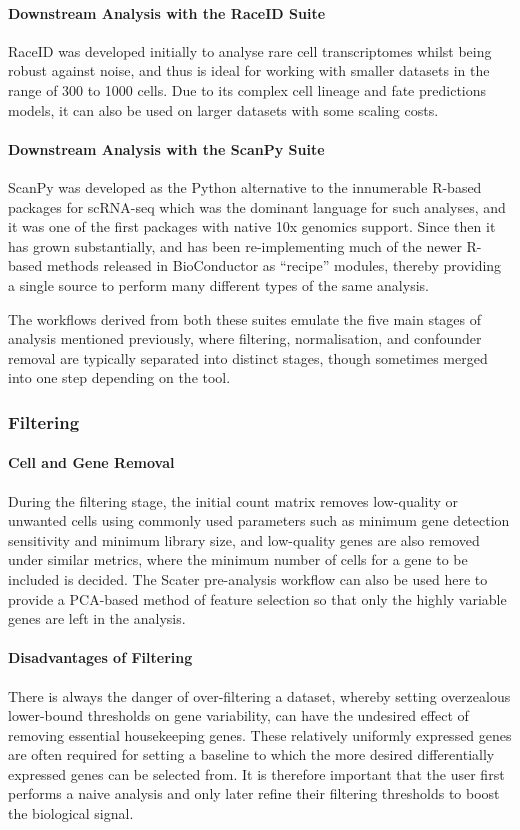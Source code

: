 \documentclass[a4paper,num-refs]{oup-contemporary}
\begin{document}
\paragraph{Downstream Analysis with the RaceID Suite}
RaceID was developed initially to analyse rare cell transcriptomes whilst being robust against noise, and thus is ideal for working with smaller datasets in the range of 300 to 1000 cells. Due to its complex cell lineage and fate predictions models, it can also be used on larger datasets with some scaling costs. 

\paragraph{Downstream Analysis with the ScanPy Suite}
ScanPy was developed as the Python alternative to the innumerable R-based packages for scRNA-seq which was the dominant language for such analyses, and it was one of the first packages with native 10x genomics support. Since then it has grown substantially, and has been re-implementing much of the newer R-based methods released in BioConductor as ``recipe'' modules, thereby providing a single source to perform many different types of the same analysis.

The workflows derived from both these suites emulate the five main stages of analysis mentioned previously, where filtering, normalisation, and confounder removal are typically separated into distinct stages, though sometimes merged into one step depending on the tool.

\subsubsection{Filtering}

\paragraph{Cell and Gene Removal}
During the filtering stage, the initial count matrix removes low-quality or unwanted cells using commonly used parameters such as minimum gene detection sensitivity and minimum library size, and low-quality genes are also removed under similar metrics, where the minimum number of cells for a gene to be included is decided. The Scater pre-analysis workflow can also be used here to provide a PCA-based method of feature selection so that only the highly variable genes are left in the analysis.

\paragraph{Disadvantages of Filtering}
There is always the danger of over-filtering a dataset, whereby setting overzealous lower-bound thresholds on gene variability, can have the undesired effect of removing essential housekeeping genes. These relatively uniformly expressed genes are often required for setting a baseline to which the more desired differentially expressed genes can be selected from.
It is therefore important that the user first performs a naive analysis and only later refine their filtering thresholds
to boost the biological signal.
\end{document}
